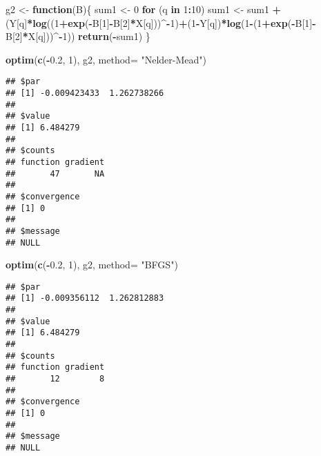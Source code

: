 \documentclass[
]{article}
\newenvironment{Shaded}{\begin{snugshade}}{\end{snugshade}}
\newcommand{\AttributeTok}[1]{\textcolor[rgb]{0.13,0.29,0.53}{#1}}
\newcommand{\ControlFlowTok}[1]{\textcolor[rgb]{0.13,0.29,0.53}{\textbf{#1}}}
\newcommand{\DecValTok}[1]{\textcolor[rgb]{0.00,0.00,0.81}{#1}}
\newcommand{\FloatTok}[1]{\textcolor[rgb]{0.00,0.00,0.81}{#1}}
\newcommand{\FunctionTok}[1]{\textcolor[rgb]{0.13,0.29,0.53}{\textbf{#1}}}
\newcommand{\NormalTok}[1]{#1}
\newcommand{\OtherTok}[1]{\textcolor[rgb]{0.56,0.35,0.01}{#1}}
\newcommand{\SpecialCharTok}[1]{\textcolor[rgb]{0.81,0.36,0.00}{\textbf{#1}}}
\newcommand{\StringTok}[1]{\textcolor[rgb]{0.31,0.60,0.02}{#1}}
\begin{document}
\begin{Shaded}
\begin{Highlighting}[]
\NormalTok{g2 }\OtherTok{\textless{}{-}} \ControlFlowTok{function}\NormalTok{(B)\{}
\NormalTok{  sum1 }\OtherTok{\textless{}{-}} \DecValTok{0}
  \ControlFlowTok{for}\NormalTok{ (q }\ControlFlowTok{in} \DecValTok{1}\SpecialCharTok{:}\DecValTok{10}\NormalTok{)}
\NormalTok{    sum1 }\OtherTok{\textless{}{-}}\NormalTok{ sum1 }\SpecialCharTok{+}\NormalTok{ (Y[q]}\SpecialCharTok{*}\FunctionTok{log}\NormalTok{((}\DecValTok{1}\SpecialCharTok{+}\FunctionTok{exp}\NormalTok{(}\SpecialCharTok{{-}}\NormalTok{B[}\DecValTok{1}\NormalTok{]}\SpecialCharTok{{-}}\NormalTok{B[}\DecValTok{2}\NormalTok{]}\SpecialCharTok{*}\NormalTok{X[q]))}\SpecialCharTok{\^{}{-}}\DecValTok{1}\NormalTok{)}\SpecialCharTok{+}\NormalTok{(}\DecValTok{1}\SpecialCharTok{{-}}\NormalTok{Y[q])}\SpecialCharTok{*}\FunctionTok{log}\NormalTok{(}\DecValTok{1}\SpecialCharTok{{-}}\NormalTok{(}\DecValTok{1}\SpecialCharTok{+}\FunctionTok{exp}\NormalTok{(}\SpecialCharTok{{-}}\NormalTok{B[}\DecValTok{1}\NormalTok{]}\SpecialCharTok{{-}}\NormalTok{B[}\DecValTok{2}\NormalTok{]}\SpecialCharTok{*}\NormalTok{X[q]))}\SpecialCharTok{\^{}{-}}\DecValTok{1}\NormalTok{))}
  \FunctionTok{return}\NormalTok{(}\SpecialCharTok{{-}}\NormalTok{sum1)}
\NormalTok{\}}

\FunctionTok{optim}\NormalTok{(}\FunctionTok{c}\NormalTok{(}\SpecialCharTok{{-}}\FloatTok{0.2}\NormalTok{, }\DecValTok{1}\NormalTok{), g2, }\AttributeTok{method=} \StringTok{"Nelder{-}Mead"}\NormalTok{)}
\end{Highlighting}
\end{Shaded}

\begin{verbatim}
## $par
## [1] -0.009423433  1.262738266
## 
## $value
## [1] 6.484279
## 
## $counts
## function gradient 
##       47       NA 
## 
## $convergence
## [1] 0
## 
## $message
## NULL
\end{verbatim}

\begin{Shaded}
\begin{Highlighting}[]
\FunctionTok{optim}\NormalTok{(}\FunctionTok{c}\NormalTok{(}\SpecialCharTok{{-}}\FloatTok{0.2}\NormalTok{, }\DecValTok{1}\NormalTok{), g2, }\AttributeTok{method=} \StringTok{"BFGS"}\NormalTok{)}
\end{Highlighting}
\end{Shaded}

\begin{verbatim}
## $par
## [1] -0.009356112  1.262812883
## 
## $value
## [1] 6.484279
## 
## $counts
## function gradient 
##       12        8 
## 
## $convergence
## [1] 0
## 
## $message
## NULL
\end{verbatim}
\end{document}
